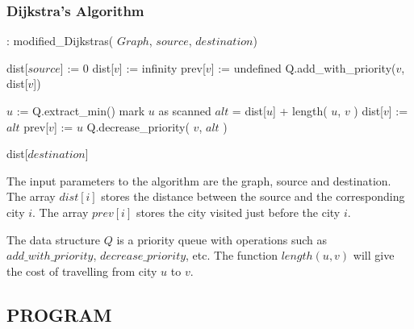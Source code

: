 		\subsubsection{Dijkstra's Algorithm}

\begin{algorithm}
\caption{ : modified\_Dijkstras( $Graph$, $source$, $destination$)} %
\begin{algorithmic}[1]  %
\STATE dist[$source$] := 0
		\STATE dist[$v$] := infinity
		\STATE prev[$v$] := undefined
	\ENDIF
	\STATE Q.add\_with\_priority($v$, dist[$v$])
\ENDFOR

	\STATE $u$ := Q.extract\_min()
	\STATE mark $u$ as scanned
			\STATE $alt$ = dist[$u$] + length( $u$, $v$ )
				\STATE dist[$v$] := $alt$
				\STATE prev[$v$] := $u$
				\STATE Q.decrease\_priority( $v$, $alt$ )
			\ENDIF
		\ENDIF
	\ENDFOR
\ENDWHILE

\RETURN dist[$destination$]
\end{algorithmic}  %
\end{algorithm}

			\par The input parameters to the algorithm are the graph, source and destination. The array $dist[i]$ stores the distance between the source and the corresponding city $i$. The array $prev[i]$ stores the city visited just before the city $i$.
			\par The data structure $Q$ is a priority queue with operations such as $add\_with\_priority$, $decrease\_priority$, etc. The function $length(u,v)$ will give the cost of travelling from city $u$ to $v$.

\newpage
	\subsection{PROGRAM}
	
